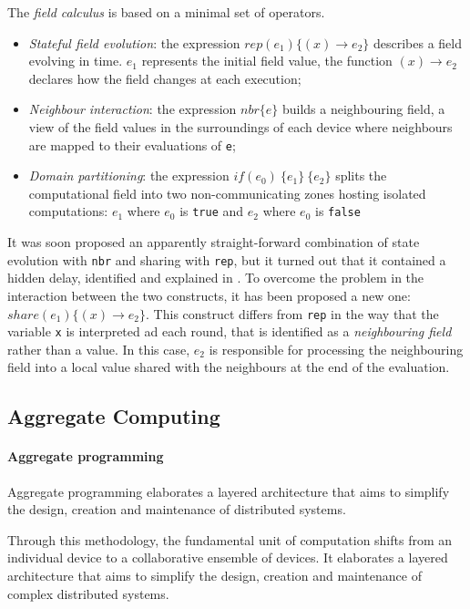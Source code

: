 The \emph{field calculus} is based on a minimal set of operators.
\begin{itemize}
    \item \emph{Stateful field evolution}: the expression $rep(e_1)\{(x) \rightarrow e_2\}$ describes a field evolving in time.
        $e_1$ represents the initial field value, the function $(x) \rightarrow e_2$ declares how the field changes
        at each execution;
    \item \emph{Neighbour interaction}: the expression $nbr\{e\}$ builds a neighbouring field, a view of the field
        values in the surroundings of each device where neighbours are mapped to their evaluations of \texttt{e};
    \item \emph{Domain partitioning}: the expression $if(e_0)\ \{e_1\}\ \{e_2\}$ splits the computational field into
        two non-communicating zones hosting isolated computations: $e_1$ where  $e_0$ is \texttt{true} and
        $e_2$ where  $e_0$ is \texttt{false}
\end{itemize}

It was soon proposed an apparently straight-forward combination of state evolution with \texttt{nbr} and sharing with \texttt{rep},
but it turned out that it contained a hidden delay, identified and explained in \cite{fieldc}.
To overcome the problem in the interaction between the two constructs, it has been proposed a new one:
$share(e_1)\{(x) \rightarrow e_2\}$.
This construct differs from \texttt{rep} in the way that the variable \texttt{x} is interpreted ad each round, that is
identified as a \emph{neighbouring field} rather than a value.
In this case, $e_2$ is responsible for processing the neighbouring field into a local value shared with the
neighbours at the end of the evaluation.

\subsection{Aggregate Computing}
\label{subsec:aggregate-computing}

\paragraph{Aggregate programming}
Aggregate programming elaborates a layered architecture that aims to simplify the design, creation and maintenance of
distributed systems.

Through this methodology, the fundamental unit of computation shifts from an individual device to a collaborative
ensemble of devices.
It elaborates a layered architecture that aims to simplify the design, creation and maintenance of complex distributed
systems.

